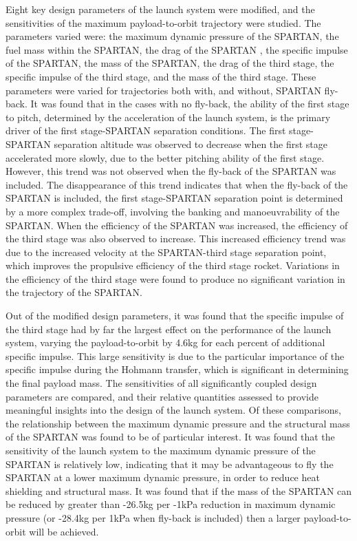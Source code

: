 Eight key design parameters of the launch system were modified, and the sensitivities of the maximum payload-to-orbit trajectory were studied.
The parameters varied were: the maximum dynamic pressure of the SPARTAN, the fuel mass within the SPARTAN, the drag of the SPARTAN , the specific impulse of the SPARTAN, the mass of the SPARTAN, the drag of the third stage, the specific impulse of the third stage, and the mass of the third stage. 
These parameters were varied for trajectories both with, and without, SPARTAN fly-back. 
It was found that in the cases with no fly-back, the ability of the first stage to pitch, determined by the acceleration of the launch system, is the primary driver of the first stage-SPARTAN separation conditions. The first stage-SPARTAN separation altitude was observed to decrease when the first stage accelerated more slowly, due to the better pitching ability of the first stage. However, this trend was not observed when the fly-back of the SPARTAN was included. The disappearance of this trend indicates that when the fly-back of the SPARTAN is included, the first stage-SPARTAN separation point is determined by a more complex trade-off, involving the banking and manoeuvrability of the SPARTAN. 
When the efficiency of the SPARTAN was increased, the efficiency of the third stage was also observed to increase. This increased efficiency trend was due to the increased velocity at the SPARTAN-third stage separation point, which improves the propulsive efficiency of the third stage rocket. 
Variations in the efficiency of the third stage were found to produce no significant variation in the trajectory of the SPARTAN. 

Out of the modified design parameters, it was found that the specific impulse of the third stage had by far the largest effect on the performance of the launch system, varying the payload-to-orbit by 4.6kg for each percent of additional specific impulse. This large sensitivity is due to the particular importance of the specific impulse during the Hohmann transfer, which is significant in determining the final payload mass. 
The sensitivities of all significantly coupled design parameters are compared, and their relative quantities assessed to provide meaningful insights into the design of the launch system. Of these comparisons, the relationship between the maximum dynamic pressure and the structural mass of the SPARTAN was found to be of particular interest. 
It was found that the sensitivity of the launch system to the maximum dynamic pressure of the SPARTAN is relatively low, indicating that it may be advantageous to fly the SPARTAN at a lower maximum dynamic pressure, in order to reduce heat shielding and structural mass. It was found that if the mass of the SPARTAN can be reduced by greater than -26.5kg per -1kPa reduction in maximum dynamic pressure (or -28.4kg per 1kPa when fly-back is included) then a larger payload-to-orbit will be achieved.
 

